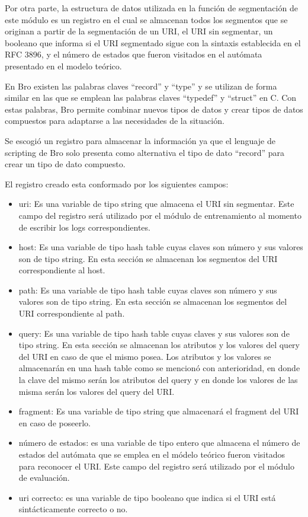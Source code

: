 Por otra parte, la estructura de datos utilizada en la función de segmentación de este módulo es un registro en el cual se almacenan todos los segmentos que se originan a partir de la segmentación de un URI, el URI sin segmentar, un booleano que informa si el URI segmentado sigue con la sintaxis establecida en el RFC 3896, y el número de estados que fueron visitados en el autómata presentado en el modelo teórico.

En Bro existen las palabras claves “record” y “type” y se utilizan de forma similar en las que se emplean las palabras claves “typedef” y “struct” en C. Con estas palabras, Bro permite combinar nuevos tipos de datos y crear tipos de datos compuestos para adaptarse a las necesidades de la situación. 

Se escogió un registro para almacenar la información ya que el lenguaje de scripting de Bro solo presenta como alternativa el tipo de dato “record” para crear un tipo de dato compuesto. 

El registro creado esta conformado por los siguientes campos:
\begin{itemize}
\item uri: Es una variable de tipo string que almacena el URI sin segmentar. Este campo del registro será utilizado por el módulo de entrenamiento al momento de escribir los logs correspondientes.
\item host: Es una variable de tipo hash table cuyas claves son número y sus valores  son de tipo string. En esta sección se almacenan los segmentos del URI correspondiente al host.
\item path: Es una variable de tipo hash table cuyas claves son número y sus valores  son de tipo string. En esta sección se almacenan los segmentos del URI correspondiente al path.
\item query: Es una variable de tipo hash table cuyas claves y sus valores son de tipo string. En esta sección se almacenan los atributos y los valores del query del URI en caso de que el mismo posea. Los atributos y los valores se almacenarán en una hash table como se mencionó con anterioridad, en donde la clave del mismo serán los atributos del query y en donde los valores de las misma serán los valores del query del URI.
\item fragment: Es una variable de tipo string que almacenará el fragment del URI en caso de poseerlo.
\item número de estados: es una variable de tipo entero que almacena el número de estados del autómata que se emplea en el módelo teórico fueron visitados para reconocer el URI. Este campo del registro será utilizado por el módulo de evaluación.
\item uri correcto: es una variable de tipo booleano que indica si el URI está sintácticamente correcto o no.
\end{itemize}

